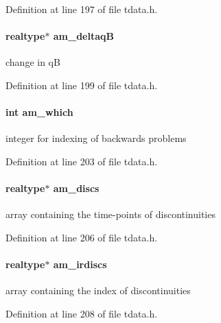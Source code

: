 Definition at line 197 of file tdata.\+h.

\hypertarget{struct_temp_data_adfe8df7debe43dd76c29e4976b1f1ae7}{}
\paragraph[{am\+\_\+deltaq\+B}]{\setlength{\rightskip}{0pt plus 5cm}realtype$\ast$ am\+\_\+deltaq\+B}\label{struct_temp_data_adfe8df7debe43dd76c29e4976b1f1ae7}
change in q\+B 

Definition at line 199 of file tdata.\+h.

\hypertarget{struct_temp_data_a961819e25ceef7e842c469cbedccb19f}{}
\paragraph[{am\+\_\+which}]{\setlength{\rightskip}{0pt plus 5cm}int am\+\_\+which}\label{struct_temp_data_a961819e25ceef7e842c469cbedccb19f}
integer for indexing of backwards problems 

Definition at line 203 of file tdata.\+h.

\hypertarget{struct_temp_data_aeb8b1beb27f1b20bda3d7de494f58c41}{}
\paragraph[{am\+\_\+discs}]{\setlength{\rightskip}{0pt plus 5cm}realtype$\ast$ am\+\_\+discs}\label{struct_temp_data_aeb8b1beb27f1b20bda3d7de494f58c41}
array containing the time-\/points of discontinuities 

Definition at line 206 of file tdata.\+h.

\hypertarget{struct_temp_data_ad64693949a923975059d0d0c49e854f9}{}
\paragraph[{am\+\_\+irdiscs}]{\setlength{\rightskip}{0pt plus 5cm}realtype$\ast$ am\+\_\+irdiscs}\label{struct_temp_data_ad64693949a923975059d0d0c49e854f9}
array containing the index of discontinuities 

Definition at line 208 of file tdata.\+h.

